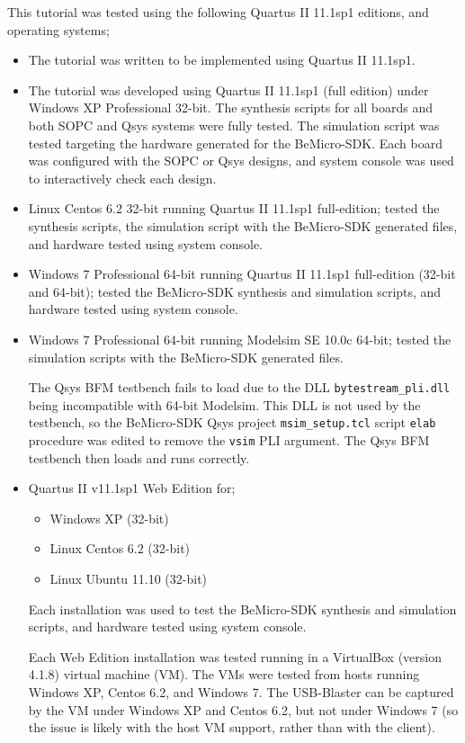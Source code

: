 \documentclass[10pt,twoside]{article}
\begin{document}
This tutorial was tested using the following Quartus II 11.1sp1
editions, and operating systems;
%
\begin{itemize}
\item The tutorial was written to be implemented using Quartus II 11.1sp1.
%
\item The tutorial was developed using Quartus II 11.1sp1
(full edition) under Windows XP Professional 32-bit. 
The synthesis scripts for all boards and both SOPC and Qsys systems
were fully tested. 
The simulation script was tested targeting the hardware generated
for the BeMicro-SDK. Each board was configured with the SOPC or
Qsys designs, and system console was used to interactively check 
each design.
%
\item Linux Centos 6.2 32-bit running Quartus II 11.1sp1 full-edition;
tested the synthesis scripts, the simulation script with the
BeMicro-SDK generated files, and hardware tested using system console.
%
%
\item Windows 7 Professional 64-bit running Quartus II 11.1sp1 full-edition
(32-bit and 64-bit);
tested the BeMicro-SDK synthesis and simulation scripts,
and hardware tested using system console.
%
\item Windows 7 Professional 64-bit running Modelsim SE 10.0c 64-bit;
tested the simulation scripts with the BeMicro-SDK generated files.

The Qsys BFM testbench fails to load due to the DLL
\verb+bytestream_pli.dll+ being incompatible with 64-bit Modelsim.
This DLL is not used by the testbench, so the BeMicro-SDK Qsys
project \verb+msim_setup.tcl+ script \verb+elab+ procedure was 
edited to remove the \verb+vsim+ PLI argument. 
The Qsys BFM testbench then loads and runs correctly.
%
\item Quartus II v11.1sp1 Web Edition for;
\begin{itemize}
\item Windows XP (32-bit)
\item Linux Centos 6.2 (32-bit)
\item Linux Ubuntu 11.10 (32-bit)
\end{itemize}
%
Each installation was used to test the BeMicro-SDK synthesis and 
simulation scripts, and hardware tested using system console.

Each Web Edition installation was tested running in a VirtualBox 
(version 4.1.8) virtual machine (VM). The VMs were tested 
from hosts running Windows XP, Centos 6.2, and Windows 7.
The USB-Blaster can be captured by the VM under Windows XP
and Centos 6.2, but not under Windows 7 (so the issue is
likely with the host VM support, rather than with the client).


\end{itemize}
\end{document}
